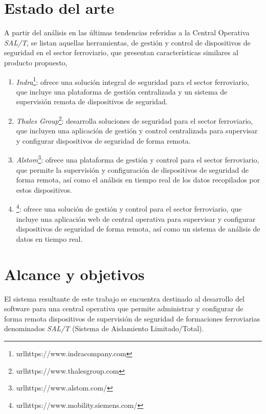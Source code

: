 \section{Estado del arte}

A partir del análisis en las últimas tendencias referidas a la Central Operativa \textit{SAL/T}, se listan aquellas herramientas, de gestión y control de dispositivos de seguridad en el sector ferroviario, que presentan características similares al producto propuesto,

\begin{enumerate}

  \item \textit{Indra}\footnote{url{https://www.indracompany.com}}: ofrece una solución integral de seguridad para el sector ferroviario, que incluye una plataforma de gestión centralizada y un sistema de supervisión remota de dispositivos de seguridad.

  \item \textit{Thales Group}\footnote{url{https://www.thalesgroup.com}}: desarrolla soluciones de seguridad para el sector ferroviario, que incluyen una aplicación de gestión y control centralizada para supervisar y configurar dispositivos de seguridad de forma remota.

  \item \textit{Alstom}\footnote{url{https://www.alstom.com/}}: ofrece una plataforma de gestión y control para el sector ferroviario, que permite la supervisión y configuración de dispositivos de seguridad de forma remota, así como el análisis en tiempo real de los datos recopilados por estos dispositivos.

  \item {}\footnote{url{https://www.mobility.siemens.com/}}: ofrece una solución de gestión y control para el sector ferroviario, que incluye una aplicación web de central operativa para supervisar y configurar dispositivos de seguridad de forma remota, así como un sistema de análisis de datos en tiempo real.

\end{enumerate}


\newpage
\section{Alcance y objetivos}

El sistema resultante de este trabajo se encuentra destinado al desarrollo del software para una central operativa que permite administrar y configurar de forma remota dispositivos de supervisión de seguridad de formaciones ferroviarias denominados \textit{SAL/T} (Sistema de Aislamiento Limitado/Total). 


